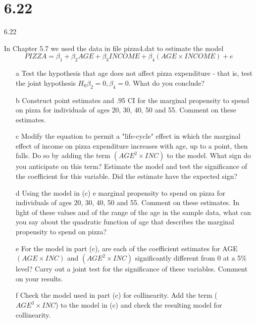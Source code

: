 \documentclass[xcolor={dvipsnames}]{beamer}
\begin{document}
\section{6.22}
\begin{frame}[allowframebreaks]{6.22}
6.22

In Chapter 5.7 we used the data in file pizza4.dat to estimate the model $$PIZZA = \beta_1 + \beta_2 AGE + \beta_3 INCOME + \beta_4 (AGE \times INCOME) + e$$

\begin{itemize}
	\item[a]
Test the hypothesis that age does not affect pizza expenditure - that is, test the joint hypothesis $H_0 \beta_2 = 0, \beta_4 = 0$. What do you conclude?

\item[b]
Construct point estimates and .95 CI for the marginal propensity to spend on pizza for individuals of ages 20, 30, 40, 50 and 55. Comment on these estimates.

\item[c]
Modify the equation to permit a "life-cycle" effect in which the marginal effect of income on pizza expenditure increases with age, up to a point, then falls. Do so by adding the term $(AGE^2 \times INC)$ to the model. What sign do you anticipate on this term? Estimate the model and test the significance of the coefficient for this variable. Did the estimate have the expected sign?

\item[d]
Using the model in (c) e marginal propensity to spend on pizza for individuals of ages 20, 30, 40, 50 and 55. Comment on these estimates. In light of these values and of the range of the age in the sample data, what can you say about the quadratic function of age that describes the marginal propensity to spend on pizza?

\item[e]
For the model in part (c), are each of the coefficient estimates for AGE $(AGE \times INC)$ and $(AGE^2 \times INC)$ significantly different from 0 at a 5\% level? Carry out a joint test for the significance of these variables. Comment on your results.

\item[f]
Check the model used in part (c) for collinearity. Add the term ($AGE^3 \times INC$) to the model in (c) and check the resulting model for collinearity.

\end{itemize}

\end{frame}
\end{document}
